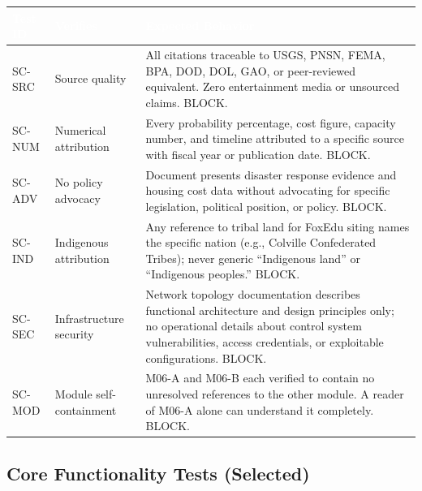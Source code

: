 \documentclass[11pt,letterpaper]{article}
\newcommand{\tableheader}[1]{\textbf{\sffamily\textcolor{white}{#1}}}
\begin{document}
\begin{center}
\begin{tabularx}{\textwidth}{C{1.5cm}L{3cm}X}
\toprule
{}
\tableheader{Test ID} & \tableheader{Verifies} & \tableheader{Expected Behavior} \\
\midrule
SC-SRC & Source quality & All citations traceable to USGS, PNSN, FEMA, BPA, DOD, DOL, GAO, or peer-reviewed equivalent. Zero entertainment media or unsourced claims. BLOCK. \\
SC-NUM & Numerical attribution & Every probability percentage, cost figure, capacity number, and timeline attributed to a specific source with fiscal year or publication date. BLOCK. \\
SC-ADV & No policy advocacy & Document presents disaster response evidence and housing cost data without advocating for specific legislation, political position, or policy. BLOCK. \\
SC-IND & Indigenous attribution & Any reference to tribal land for FoxEdu siting names the specific nation (e.g., Colville Confederated Tribes); never generic ``Indigenous land'' or ``Indigenous peoples.'' BLOCK. \\
SC-SEC & Infrastructure security & Network topology documentation describes functional architecture and design principles only; no operational details about control system vulnerabilities, access credentials, or exploitable configurations. BLOCK. \\
SC-MOD & Module self-containment & M06-A and M06-B each verified to contain no unresolved references to the other module. A reader of M06-A alone can understand it completely. BLOCK. \\
\bottomrule
\end{tabularx}
\end{center}

\subsection{Core Functionality Tests (Selected)}
\end{document}
